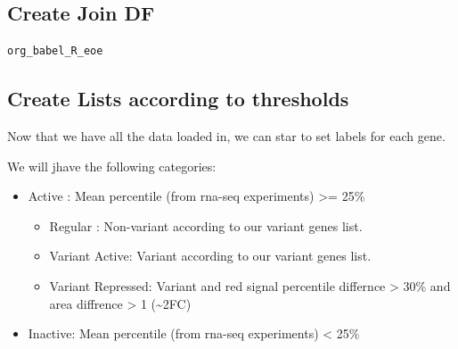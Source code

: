 \documentclass[11pt]{article}
\begin{document}
\subsection{Create Join DF}
\label{sec:orgea12e9d}
\begin{verbatim}
org_babel_R_eoe
\end{verbatim}

\subsection{Create Lists according to thresholds}
\label{sec:org88aded6}

Now that we have all the data loaded in, we can star to set labels for each gene.

We will jhave the following categories:
\begin{itemize}
\item Active : Mean percentile (from rna-seq experiments) >= 25\%
\begin{itemize}
\item Regular : Non-variant according to our variant genes list.
\item Variant Active: Variant according to our variant genes list.
\item Variant Repressed: Variant and red signal percentile differnce > 30\% and area diffrence > 1 (\textasciitilde{}2FC)
\end{itemize}

\item Inactive: Mean percentile (from rna-seq experiments) < 25\%
\end{itemize}
\end{document}
